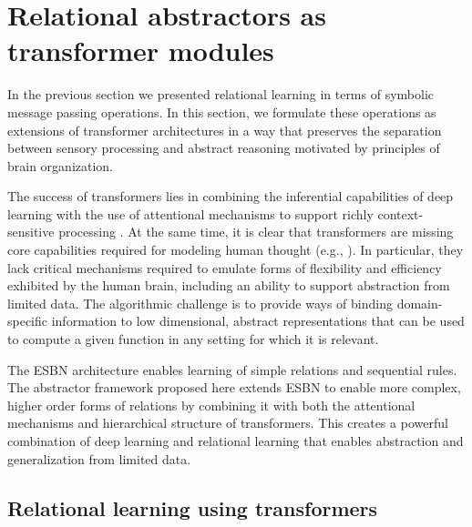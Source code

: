 \def\bra#1{\langle #1 \vert}
\def\ket#1{\vert #1 \rangle}
\def\braket#1#2{\langle #1 \vert #2 \rangle}
\def\bind#1#2{\ket{#1}|\ket{#2}}
\def\bind#1#2{#1 \| #2}
\let\tilde\widetilde
\def\softmax#1{\mbox{Softmax}\left(#1\right)}
\def\emph#1{\vskip5pt\noindent{\it\bfseries #1}}
\def\task#1{\vskip5pt\noindent{\it\bfseries #1.}}
\def\qkv#1#2#3{Q\!=\!#1,\; K\!=\!#2,\; V\!=\!#3}

\addtocounter{section}{2}
\section{Relational abstractors as transformer modules}

In the previous section we presented relational learning 
in terms of symbolic message passing operations. In this section, 
we formulate these operations as extensions of transformer architectures
in a way that preserves the separation between sensory processing and 
abstract reasoning motivated by principles of brain organization.

The success of transformers lies in combining the inferential capabilities of deep learning with the use of attentional mechanisms to support richly context-sensitive processing \citep{transformers,vaswani2017attention,kerg2020untangling}. At the same time, it is clear that transformers are missing core capabilities required for modeling human thought (e.g., \cite{mahowald2023dissociating}).  In particular, they lack critical mechanisms required to emulate forms of flexibility and efficiency exhibited by the human brain, including an ability to support abstraction from limited data. The algorithmic challenge is to provide ways of binding domain-specific information to low dimensional, abstract representations that can be used to compute a given function in any setting for which it is relevant. 

The ESBN architecture \citep{esbn} enables learning of simple relations and sequential rules. The abstractor 
framework proposed here extends ESBN to enable more complex, higher order forms of relations by combining it with both the attentional mechanisms and hierarchical structure of transformers. This creates a powerful combination of deep learning and relational learning that enables abstraction and generalization from limited data.

\subsection{Relational learning using transformers}

